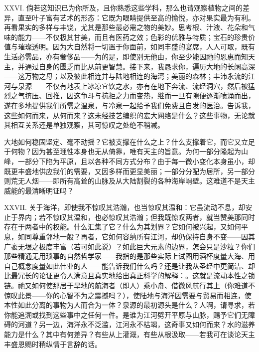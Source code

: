 XXVI. 倘若这知识已为你所及，且你熟悉这些学科，那么也请观察植物之间的差异，直至叶子富有艺术的形态：它既为眼睛提供至高的愉悦，亦对果实最为有利。再看果实的多样与丰饶，尤其是那些最必需之物的美妙。思考根、汁液、花朵和气味的能力——不仅极其甘美，而且有医药之效；色彩的优雅与特质；宝石的珍贵价值与璀璨透明。因为大自然将一切置于你面前，如同丰盛的宴席，人人可取，既有生活必需品，亦有奢侈品——为的是，即使别无他由，你至少能因祂的恩惠而知天主，并通过自身的匮乏而比从前更智慧。接下来，我恳求你，遍历大地的长阔高深——这万物之母；以及彼此相连并与陆地相连的海湾；美丽的森林；丰沛永流的江河与泉源——不仅有地表上冰凉宜饮之水，亦有在地下奔流、流经洞穴，然后被猛烈之气挤压、回推，因这争斗与抗拒之力而变热，继而一旦有隙便逐渐喷涌而出，遂在多地提供我们所需之温泉，与冷泉一起给予我们免费且自发的医治。告诉我，这些如何而来，从何而来？这未经技艺编织的宏大网络是什么？这些事物，无论就其相互关系还是单独观察，其可惊叹之处绝不稍减。\par

大地如何稳固坚定、毫不动摇？它被支撑在什么之上？什么支撑着它，而它又立足于何物？因为甚至理性本身也无从倚靠，唯有天主的旨意。为何一部分隆起为山峰，一部分下陷为平原，且以各种不同方式分布？由于每一微小变化本身虽小，却既更丰盛地供应我们的需要，又因多样而更显美丽；一部分分配为居所，另一部分则荒无人烟——即所有高耸的山脉及从大陆割裂的各种海岸峭壁。这难道不是天主威能的最清晰明证吗？\par

XXVII. 关于海洋，即使我不惊叹其浩瀚，也当惊叹其温和：它虽流动不息，却安止于界内；若不惊叹其温和，也必惊叹其浩瀚；但我既惊叹两者，就当赞美那同时存在于两者中的权能。什么汇集了它？什么为其划界？它如何被兴起，又如何平息，如同尊重邻地一般？再者，它如何容纳所有江河，却仍保持自身不变——因其广袤无垠之极度丰富（若可如此说）？如此巨大元素的边界，怎会只是沙粒？你们那些精通无用琐事的自然哲学家——我指的是那些实际上试图用酒杯度量大海、用自己概念度量如此伟业的人——能告诉我们什么吗？还是让我从圣经中更简洁、却比最冗长的论证更令人满意且真实地给出真正科学的解释：。这就是流动本性之锁链。祂又如何使那居于旱地的航海者（即人）乘小舟、借微风航行其上（你难道不惊叹此景——你的心智不为之震撼吗？），使陆地与海洋因需要与贸易而相连，使本性如此分离的事物为人而合为一体？泉源的最初源头是什么？人啊，请寻求，若你能追溯或找到这些事中之任何一件。是谁为江河劈开平原与山脉，赐予它们无障碍的河道？另一边，海洋永不泛滥，江河永不枯竭，这奇事又如何而来？水的滋养能力是什么？其中有何差异？有些从上灌溉，有些从根汲取——若我可在谈论天主丰盛恩赐时稍纵情于言辞的话。\par

